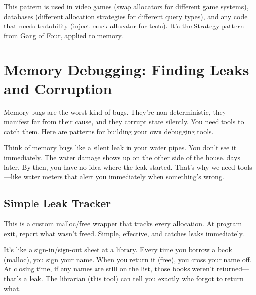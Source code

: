 \begin{tipbox}
This pattern is used in video games (swap allocators for different game systems), databases (different allocation strategies for different query types), and any code that needs testability (inject mock allocator for tests). It's the Strategy pattern from Gang of Four, applied to memory.
\end{tipbox}

\section{Memory Debugging: Finding Leaks and Corruption}

Memory bugs are the worst kind of bugs. They're non-deterministic, they manifest far from their cause, and they corrupt state silently. You need tools to catch them. Here are patterns for building your own debugging tools.

Think of memory bugs like a silent leak in your water pipes. You don't see it immediately. The water damage shows up on the other side of the house, days later. By then, you have no idea where the leak started. That's why we need tools—like water meters that alert you immediately when something's wrong.

\subsection{Simple Leak Tracker}

This is a custom malloc/free wrapper that tracks every allocation. At program exit, report what wasn't freed. Simple, effective, and catches leaks immediately.

It's like a sign-in/sign-out sheet at a library. Every time you borrow a book (malloc), you sign your name. When you return it (free), you cross your name off. At closing time, if any names are still on the list, those books weren't returned—that's a leak. The librarian (this tool) can tell you exactly who forgot to return what.


